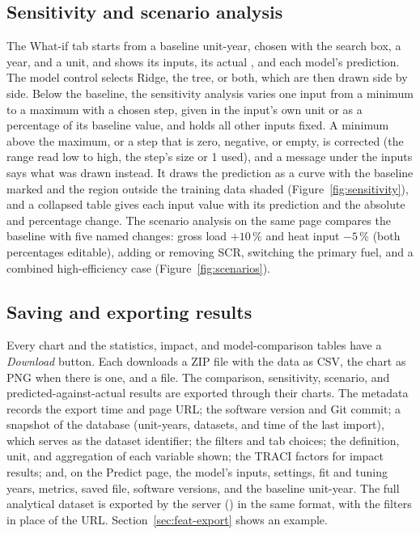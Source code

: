 \documentclass[11pt,a4paper]{article}
\begin{document}
\subsection{Sensitivity and scenario analysis}

The What-if tab starts from a baseline unit-year, chosen with the search box, a year, and a
unit, and shows its inputs, its actual \NOx{}, and each model's prediction. The model control
selects Ridge, the tree, or both, which are then drawn side by side. Below the baseline, the
sensitivity analysis varies one input from a minimum to a
maximum with a chosen step, given in the input's own unit or as a percentage of its baseline
value, and holds all other inputs fixed. A minimum above the maximum, or a step that is zero,
negative, or empty, is corrected (the range read low to high, the step's size or 1 used), and a
message under the inputs says what was drawn instead. It draws the prediction as a curve with the baseline
marked and the region outside the training data shaded (Figure~\ref{fig:sensitivity}), and a
collapsed table gives each input value with its prediction and the absolute and percentage
change. The scenario analysis on the same page compares the baseline with five named changes:
gross load $+10\,\%$ and heat input $-5\,\%$ (both percentages editable), adding or removing SCR,
switching the primary fuel, and a combined high-efficiency case (Figure~\ref{fig:scenarios}).

\subsection{Saving and exporting results}
\label{sec:exports}

Every chart and the statistics, impact, and model-comparison tables have a \emph{Download}
button. Each downloads a ZIP file with the data as CSV, the chart as PNG
when there is one, and a  file. The comparison, sensitivity, scenario, and
predicted-against-actual results are exported through their charts. The metadata records the export time and page URL; the
software version and Git commit; a snapshot of the database (unit-years, datasets, and time of
the last import), which serves as the dataset identifier; the filters and tab choices; the
definition, unit, and aggregation of each variable shown; the TRACI factors for impact results;
and, on the Predict page, the model's inputs, settings, fit and tuning years, metrics, saved file,
software versions, and the baseline unit-year. The full analytical dataset is exported by the
server () in the same format, with the filters in place of the
URL. Section~\ref{sec:feat-export} shows an example.
\end{document}

